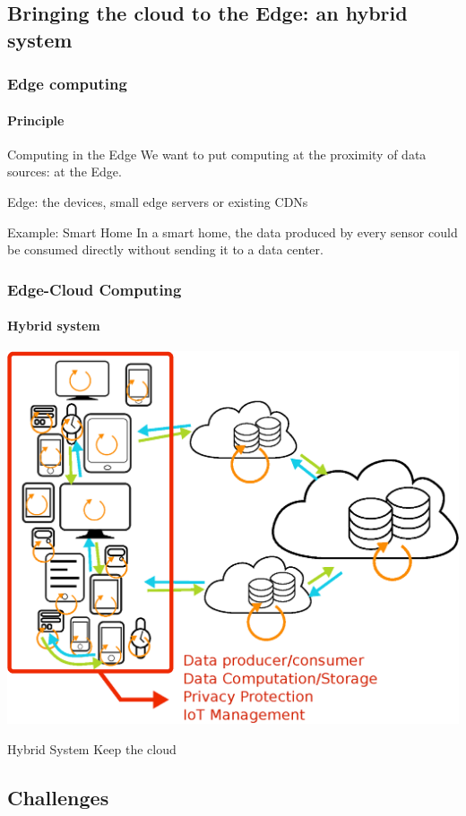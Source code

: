 \documentclass[utf8,xcolor=table, page number]{earlywinter}
\begin{document}
\subsection{Bringing the cloud to the Edge: an hybrid system} %
\begin{frame}
  \frametitle{Edge computing}
  \framesubtitle{Principle}

  \begin{block}{Computing in the Edge}
   We want to put computing at the proximity of data sources: at the Edge.
  \end{block}
  \vfill
  Edge: the devices, small edge servers or existing CDNs
  \vfill
   \begin{exampleblock}{Example: Smart Home}
     In a smart home, the data produced by every sensor could be consumed directly without sending it to a data center.
   \end{exampleblock}

\end{frame}

\begin{frame}
\frametitle{Edge-Cloud Computing}
\framesubtitle{Hybrid system}

  \begin{center}
    \includegraphics[width=0.6\linewidth]{edgePrinciple.eps}
  \end{center}
  
  \begin{alertblock}{Hybrid System}
    Keep the cloud
  \end{alertblock}

\end{frame}

\subsection{Challenges}
\end{document}
